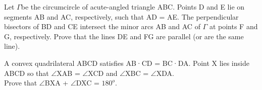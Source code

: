 \item Let $\Gamma$be the circumcircle of acute-angled triangle ABC. Points D and E lie on segments AB and AC, respectively, such that AD = AE. The perpendicular bisectors of BD and
CE intersect the minor arcs AB and AC of $\Gamma$ at points F and G, respectively. Prove that the lines DE and FG are parallel (or are the same line).

\item A convex quadrilateral ABCD satisfies AB·CD = BC·DA. Point X lies inside
ABCD so that $\angle$XAB = $\angle$XCD and $\angle$XBC = $\angle$XDA.\\
Prove that $\angle$BXA + $\angle$DXC = $180^{o}$.
